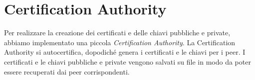 \chapter{Certification Authority}
	Per realizzare la creazione dei certificati e delle chiavi pubbliche
	e private, abbiamo implementato una piccola \emph{Certification Authority}.
	La Certification Authority si autocertifica, dopodiché genera i
	certificati e le chiavi per i peer. I certificati e le chiavi
	pubbliche e private vengono salvati su file in modo da poter essere
	recuperati dai peer corrispondenti.
\clearpage{\pagestyle{empty}\cleardoublepage}

